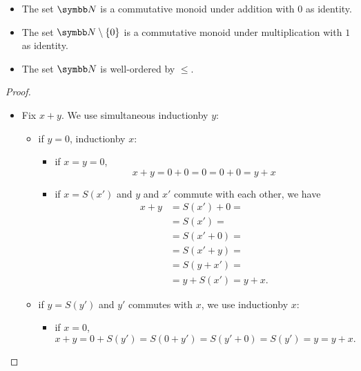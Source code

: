 \begin{proposition}\label{def:natural_numbers}
  \begin{itemize}\mbox{}
    \item The set \( \BN \) is a commutative monoid under addition with \( 0 \) as identity.
    \item The set \( \BN \setminus \{ 0 \} \) is a commutative monoid under multiplication with \( 1 \) as identity.
    \item The set \( \BN \) is well-ordered by \( \leq \).
  \end{itemize}
\end{proposition}
\begin{proof}
  \begin{itemize}\mbox{}
    \item Fix \( x + y \). We use simultaneous induction\IND by \( y \):
    \begin{itemize}
      \item if \( y = 0 \), induction\IND by \( x \):
      \begin{itemize}
        \item if \( x = y = 0 \),
        \begin{equation*}
          x + y = 0 + 0 = 0 = 0 + 0 = y + x
        \end{equation*}

        \item if \( x = S(x') \) and \( y \) and \( x' \) commute with each other, we have
        \begin{align*}
          x + y
          &=
          S(x') + 0
          = \\ &=
          S(x')
          = \\ &=
          S(x' + 0)
          = \\ &=
          S(x' + y)
          = \\ &=
          S(y + x')
          = \\ &=
          y + S(x')
          =
          y + x.
        \end{align*}
      \end{itemize}

      \item if \( y = S(y') \) and \( y' \) commutes with \( x \), we use induction\IND by \( x \):
      \begin{itemize}
        \item if \( x = 0 \),
        \begin{equation*}
          x + y = 0 + S(y') = S(0 + y') = S(y' + 0) = S(y') = y = y + x.
        \end{equation*}


\end{itemize}
\end{itemize}
\end{itemize}
\end{proof}
